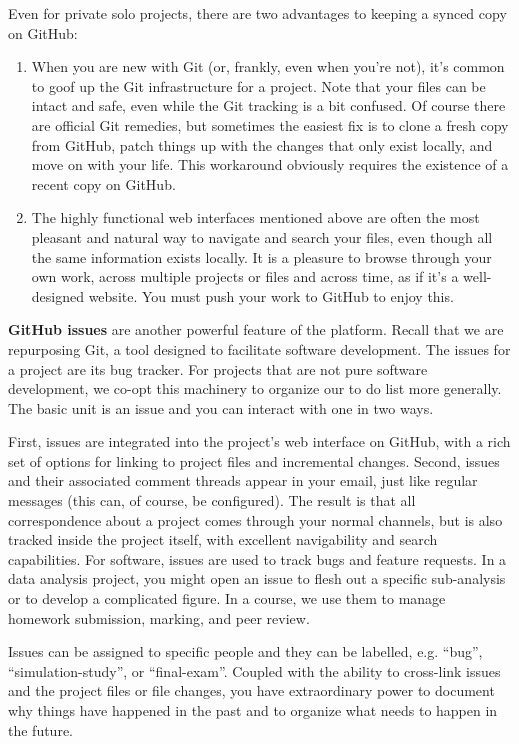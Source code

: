 \documentclass[12pt]{article}
\begin{document}
Even for private solo projects, there are two advantages to keeping a
synced copy on GitHub:

\begin{enumerate}
\def\labelenumi{\arabic{enumi}.}
\item
  When you are new with Git (or, frankly, even when you're not), it's
  common to goof up the Git infrastructure for a project. Note that your
  files can be intact and safe, even while the Git tracking is a bit
  confused. Of course there are official Git remedies, but sometimes the
  easiest fix is to clone a fresh copy from GitHub, patch things up with
  the changes that only exist locally, and move on with your life. This
  workaround obviously requires the existence of a recent copy on
  GitHub.
\item
  The highly functional web interfaces mentioned above are often the
  most pleasant and natural way to navigate and search your files, even
  though all the same information exists locally. It is a pleasure to
  browse through your own work, across multiple projects or files and
  across time, as if it's a well-designed website. You must push your
  work to GitHub to enjoy this.
\end{enumerate}

\textbf{GitHub issues} are another powerful feature of the platform.
Recall that we are repurposing Git, a tool designed to facilitate
software development. The issues for a project are its bug tracker. For
projects that are not pure software development, we co-opt this
machinery to organize our to do list more generally. The basic unit is
an issue and you can interact with one in two ways.

First, issues are integrated into the project's web interface on GitHub,
with a rich set of options for linking to project files and incremental
changes. Second, issues and their associated comment threads appear in
your email, just like regular messages (this can, of course, be
configured). The result is that all correspondence about a project comes
through your normal channels, but is also tracked inside the project
itself, with excellent navigability and search capabilities. For
software, issues are used to track bugs and feature requests. In a data
analysis project, you might open an issue to flesh out a specific
sub-analysis or to develop a complicated figure. In a course, we use
them to manage homework submission, marking, and peer review.

Issues can be assigned to specific people and they can be labelled, e.g.
``bug'', ``simulation-study'', or ``final-exam''. Coupled with the
ability to cross-link issues and the project files or file changes, you
have extraordinary power to document why things have happened in the
past and to organize what needs to happen in the future.
\end{document}

